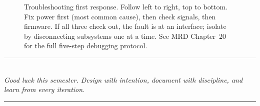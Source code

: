 \documentclass[11pt,letterpaper]{article}
\begin{document}
\begin{figure}[htbp]
{%
}%
\caption{Troubleshooting first response. Follow left to right, top to bottom. Fix power first (most common cause), then check signals, then firmware. If all three check out, the fault is at an interface; isolate by disconnecting subsystems one at a time. See MRD Chapter~20 for the full five-step debugging protocol.}
\end{figure}

\vspace{1cm}
\begin{center}
\textcolor{minesblue}{\rule{0.4\textwidth}{1pt}}\\[6pt]
\textit{Good luck this semester. Design with intention, document with discipline, and learn from every iteration.}\\[6pt]
\textcolor{minesblue}{\rule{0.4\textwidth}{1pt}}
\end{center}
\end{document}
